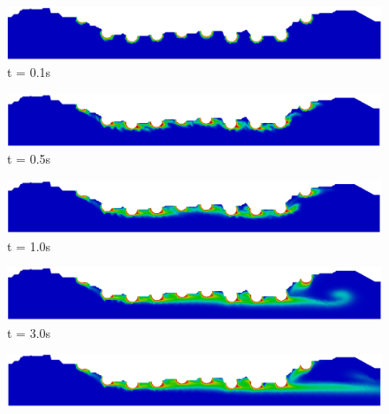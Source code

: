 \begin{figure}[H]
     \begin{minipage}{.50\linewidth}
      \centering
      \includegraphics[scale=0.18]{./02_chaps/cap_solution/figure/conc100_RealStrut1.png}\\
      t = 0.1s
     \end{minipage}%
     \begin{minipage}{.50\linewidth}
      \centering
      \includegraphics[scale=0.18]{./02_chaps/cap_solution/figure/conc100_RealStrut2.png}\\
      t = 0.5s
     \end{minipage}
     \begin{minipage}{.50\linewidth}
     \medskip
      \centering
      \includegraphics[scale=0.18]{./02_chaps/cap_solution/figure/conc100_RealStrut3.png}\\
      t = 1.0s
     \end{minipage}%
     \begin{minipage}{.50\linewidth}
     \medskip
      \centering
      \includegraphics[scale=0.18]{./02_chaps/cap_solution/figure/conc100_RealStrut4.png}\\
      t = 3.0s
     \end{minipage}
     \begin{minipage}{.50\linewidth}
      \centering
      \includegraphics[scale=0.18]{./02_chaps/cap_solution/figure/conc100_RealStrut5.png}\\

\end{minipage}
\end{figure}
